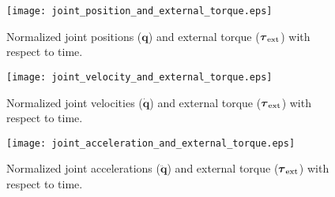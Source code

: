 \begin{figure}
\centering
\texttt{[image: joint\_position\_and\_external\_torque.eps]}
\caption{Normalized joint positions ($\mathbf{q}$) and external torque ($\boldsymbol{\tau}_\mathrm{ext}$) with respect to time.}
\label{fig:act1.1.2_tau_and_q}
\end{figure}

\begin{figure}
\centering
\texttt{[image: joint\_velocity\_and\_external\_torque.eps]}
\caption{Normalized joint velocities ($\mathbf{\dot{q}}$) and external torque ($\boldsymbol{\tau}_\mathrm{ext}$) with respect to time.}
\label{fig:act1.1.2_tau_and_dq}
\end{figure}

\begin{figure}
\centering
\texttt{[image: joint\_acceleration\_and\_external\_torque.eps]}
\caption{Normalized joint accelerations ($\mathbf{\ddot{q}}$) and external torque ($\boldsymbol{\tau}_\mathrm{ext}$) with respect to time.}
\label{fig:act1.1.2_tau_and_ddq}
\end{figure}

